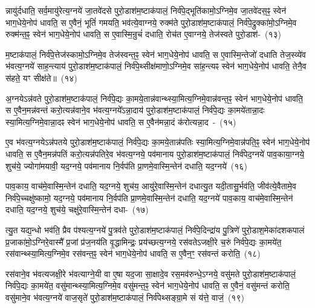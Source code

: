 न्नायु॑र्दधाति॒ सर्व॒मायु॑रेत्य॒ग्नये॑ जा॒तवे॑दसे पुरो॒डाश॑\-म॒ष्टा\-क॑पालं॒ निर्व॑पे॒द्भूति॑कामो॒\-ऽग्निमे॒व जा॒तवे॑दस॒ꣴ॒ स्वेन॑ भाग॒\-धेये॒नोप॑ धावति॒ स ए॒वैनं॒ भूतिं॑ गमयति॒ भव॑त्ये॒वाग्नये॒ रुक्म॑ते पुरो॒डाश॑\-म॒ष्टा\-क॑पालं॒ निर्व॑पे॒द्रुक्का॑मो॒\-ऽग्निमे॒व रुक्म॑न्त॒ꣴ॒ स्वेन॑ भाग॒\-धेये॒नोप॑ धावति॒ स ए॒वास्मि॒न्रुचं॑ दधाति॒ रोच॑त ए॒वाग्नये॒ तेज॑स्वते पुरो॒डाश॑-~(१३)\ip

म॒ष्टा\-क॑पालं॒ निर्व॑पे॒त्तेज॑स्कामो॒\-ऽग्निमे॒व तेज॑स्वन्त॒ꣴ॒ स्वेन॑ भाग॒\-धेये॒नोप॑ धावति॒ स ए॒वास्मि॒न्तेजो॑ दधाति तेज॒स्व्ये॑व भ॑वत्य॒ग्नये॑ साह॒न्त्याय॑ पुरो॒डाश॑\-म॒ष्टा\-क॑पालं॒ निर्व॑पे॒थ्सीक्ष॑माणो॒\-ऽग्निमे॒व सा॑ह॒न्त्यꣴ स्वेन॑ भाग॒\-धेये॒नोप॑ धावति॒ तेनै॒व स॑हते॒ यꣳ सीक्ष॑ते॥~(१४)\ip

{\anuvakamend[{भ्रातृ॑व्यस्यास्मि॒न्तेज॑स्वते पुरो॒डाश॑\-म॒ष्टात्रिꣳ॑शच्च}]}

अ॒ग्नये\-ऽन्न॑वते पुरो॒डाश॑\-म॒ष्टा\-क॑पालं॒ निर्व॑पे॒द्यः का॒मये॒तान्न॑\-वान्थ्स्या॒मित्य॒ग्नि\-मे॒वान्न॑वन्त॒ꣴ॒ स्वेन॑ भाग॒\-धेये॒नोप॑ धावति॒ स ए॒वैन॒मन्न॑वन्तं करो॒त्यन्न॑वाने॒व भ॑वत्य॒ग्नये᳚\-ऽन्ना॒दाय॑ पुरो॒डाश॑\-म॒ष्टाक॑पालं॒ निर्व॑पे॒द्यः का॒मये॑तान्ना॒दः स्या॒मित्य॒ग्निमे॒वान्ना॒दꣴ स्वेन॑ भाग॒\-धेये॒नोप॑ धावति॒ स ए॒वैन॑मन्ना॒दं क॑रोत्यन्ना॒द~-~(१५)\ip

ए॒व भ॑वत्य॒ग्नये\-ऽन्न॑पतये पुरो॒डाश॑\-म॒ष्टा\-क॑पालं॒ निर्व॑पे॒द्यः का॒मये॒तान्न॑पतिः स्या॒मित्य॒ग्नि\-मे॒वान्न॑\-पति॒ꣴ॒ स्वेन॑ भाग॒\-धेये॒नोप॑ धावति॒ स ए॒वैन॒मन्न॑पतिं करो॒त्यन्न॑पतिरे॒व भ॑वत्य॒ग्नये॒ पव॑मानाय पुरो॒डाश॑\-म॒ष्टा\-क॑पालं॒ निर्व॑पेद॒ग्नये॑ पाव॒काया॒ग्नये॒ शुच॑ये॒ ज्योगा॑मयावी॒ यद॒ग्नये॒ पव॑मानाय नि॒र्वप॑ति प्रा॒णमे॒वास्मि॒न्तेन॑ दधाति॒ यद॒ग्नये॑~(१६)\ip

पाव॒काय॒ वाच॑मे॒वास्मि॒न्तेन॑ दधाति॒ यद॒ग्नये॒ शुच॑य॒ आयु॑रे॒वास्मि॒न्तेन॑ दधात्यु॒त यदी॒तासु॒र्भव॑ति॒ जीव॑त्ये॒वैतामे॒व निर्व॑पे॒च्चक्षु॑ष्कामो॒ यद॒ग्नये॒ पव॑मानाय नि॒र्वप॑ति प्रा॒णमे॒वा\-स्मि॒न्तेन॑ दधाति॒ यद॒ग्नये॑ पाव॒काय॒ वाच॑मे॒वास्मि॒न्तेन॑ दधाति॒ यद॒ग्नये॒ शुच॑ये॒ चक्षु॑रे॒वास्मि॒न्तेन॑ दधा-~(१७)\ip

त्यु॒त यद्य॒न्धो भव॑ति॒ प्रैव प॑श्यत्य॒ग्नये॑ पु॒त्रव॑ते पुरो॒डाश॑\-म॒ष्टा\-क॑पालं॒ निर्व॑पे॒दिन्द्रा॑य पु॒त्रिणे॑ पुरो॒डाश॒मेका॑\-दश\-कपालं प्र॒जाका॑मो़॒\-ऽग्निरे॒वास्मै᳚ प्र॒जां प्र॑ज॒नय॑ति वृ॒द्धामिन्द्रः॒ प्रय॑च्छत्य॒ग्नये॒ रस॑वते\-ऽजक्षी॒रे च॒रुं निर्व॑पे॒द्यः का॒मये॑त॒ रस॑वान्थ्स्या॒मित्य॒ग्निमे॒व रस॑वन्त॒ꣴ॒ स्वेन॑ भाग॒\-धेये॒नोप॑ धावति॒ स ए॒वैन॒ꣳ॒ रस॑वन्तं करोति॒~(१८)\ip

रस॑वाने॒व भ॑वत्यजक्षी॒रे भ॑वत्याग्ने॒यी वा ए॒षा यद॒जा सा॒क्षादे॒व रस॒मव॑\-रुन्धे॒\-ऽग्नये॒ वसु॑मते पुरो॒डाश॑\-म॒ष्टा\-क॑पालं॒ निर्व॑पे॒द्यः का॒मये॑त॒ वसु॑मान्थ्स्या॒मित्य॒ग्निमे॒व वसु॑मन्त॒ꣴ॒ स्वेन॑ भाग॒\-धेये॒नोप॑ धावति॒ स ए॒वैनं॒ वसु॑मन्तं करोति॒ वसु॑माने॒व भ॑वत्य॒ग्नये॑ वाज॒सृते॑ पुरो॒डाश॑\-म॒ष्टा\-क॑पालं॒ निर्व॑पेथ्सङ्ग्रा॒मे सं य॑त्ते॒ वाजं॒~(१९)\ip

